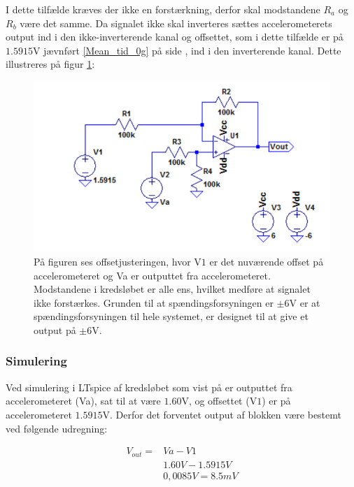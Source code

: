 I dette tilfælde kræves der ikke en forstærkning, derfor skal modstandene $R_{a}$ og $R_{b}$ være det samme. Da signalet ikke skal inverteres sættes accelerometerets output ind i den ikke-inverterende kanal og offsettet, som i dette tilfælde er på $1.5915$V jævnført  \ref{Mean_tid_0g} på side \pageref{Mean_tid_0g}, ind i den inverterende kanal. Dette illustreres på figur \ref{fig:Offset_generisk}:
\begin{figure}[H]
\centering
\includegraphics[scale=1]{figures/cProblemloesning/Offset_generisk.png}
\caption{På figuren ses offsetjusteringen, hvor V$1$ er det nuværende offset på accelerometeret og Va er outputtet fra accelerometeret. Modstandene i kredsløbet er alle ens, hvilket medføre at signalet ikke forstærkes. Grunden til at spændingsforsyningen er $\pm 6$V er at spændingsforsyningen til hele systemet, er designet til at give et output på $\pm 6$V.}
\label{fig:Offset_generisk}
\end{figure}

\subsubsection{Simulering}
Ved simulering i LTspice af kredsløbet som vist på  er outputtet fra accelerometeret (Va), sat til at være $1.60$V, og offsettet (V$1$) er på accelerometeret $1.5915$V. Derfor det forventet output af blokken være bestemt ved følgende udregning: 

\begin{equation}
\begin{aligned}
V_{out}={} & Va - V1 \\
           & 1.60V - 1.5915V \\
           &  0,0085V = 8.5mV
\end{aligned}
\end{equation}


